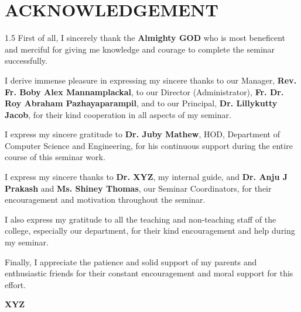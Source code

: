\chapter*{ACKNOWLEDGEMENT}

\begin{spacing}{1.5}
First of all, I sincerely thank the \textbf{Almighty GOD} who is most beneficent and merciful for giving me knowledge and courage to complete the seminar successfully.

\bigskip
I derive immense pleasure in expressing my sincere thanks to our Manager, \textbf{Rev. Fr. Boby Alex Mannamplackal}, to our Director (Administrator), \textbf{Fr. Dr. Roy Abraham Pazhayaparampil}, and to our Principal, \textbf{Dr. Lillykutty Jacob}, for their kind cooperation in all aspects of my seminar.

\bigskip
I express my sincere gratitude to \textbf{Dr. Juby Mathew}, HOD, Department of Computer Science and Engineering, for his continuous support during the entire course of this seminar work.

\bigskip
I express my sincere thanks to \textbf{Dr. XYZ}, my internal guide, and \textbf{Dr. Anju J Prakash} and \textbf{Ms. Shiney Thomas}, our Seminar Coordinators, for their encouragement and motivation throughout the seminar.

\bigskip
I also express my gratitude to all the teaching and non-teaching staff of the college, especially our department, for their kind encouragement and help during my seminar.

\bigskip
Finally, I appreciate the patience and solid support of my parents and enthusiastic friends for their constant encouragement and moral support for this effort.

\vspace{1.5cm}
\begin{flushright}
\textbf{XYZ}
\end{flushright}
\end{spacing}
